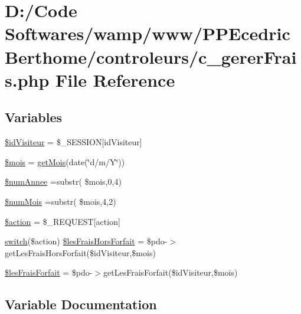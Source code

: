 \hypertarget{c__gerer_frais_8php}{}\section{D\+:/\+Code Softwares/wamp/www/\+P\+P\+Ecedric\+Berthome/controleurs/c\+\_\+gerer\+Frais.php File Reference}
\label{c__gerer_frais_8php}
\subsection*{Variables}
\begin{DoxyCompactItemize}
\item 
\hyperlink{c__gerer_frais_8php_a06480cb765d32df12f67a3589b6b9507}{\$id\+Visiteur} = \$\+\_\+\+S\+E\+S\+S\+I\+ON\mbox{[}\textquotesingle{}id\+Visiteur\textquotesingle{}\mbox{]}
\item 
\hyperlink{c__gerer_frais_8php_ac3dd350c90be7c45f992a6efde984c66}{\$mois} = \hyperlink{include_2fct_8inc_8php_ac6b26dbc90d7a5ec71b0585ee0786a41}{get\+Mois}(date(\char`\"{}d/m/Y\char`\"{}))
\item 
\hyperlink{c__gerer_frais_8php_a21260be3fef816c4fd65c88632805608}{\$num\+Annee} =substr( \$mois,0,4)
\item 
\hyperlink{c__gerer_frais_8php_a492eee9291ffecde802027790eb8b37d}{\$num\+Mois} =substr( \$mois,4,2)
\item 
\hyperlink{c__gerer_frais_8php_aa698a3e72116e8e778be0e95d908ee30}{\$action} = \$\+\_\+\+R\+E\+Q\+U\+E\+ST\mbox{[}\textquotesingle{}action\textquotesingle{}\mbox{]}
\item 
\hyperlink{index_8php_a6160ae6d9a60bbcc19780fa9bc2c9b41}{switch}(\$action) \hyperlink{c__gerer_frais_8php_ab7a92e15abaa9368bcdc2890538d0d61}{\$les\+Frais\+Hors\+Forfait} = \$pdo-\/$>$get\+Les\+Frais\+Hors\+Forfait(\$id\+Visiteur,\$mois)
\item 
\hyperlink{c__gerer_frais_8php_aeeb17c906a5d4d10f8628d3e440e4626}{\$les\+Frais\+Forfait} = \$pdo-\/$>$get\+Les\+Frais\+Forfait(\$id\+Visiteur,\$mois)
\end{DoxyCompactItemize}


\subsection{Variable Documentation}

